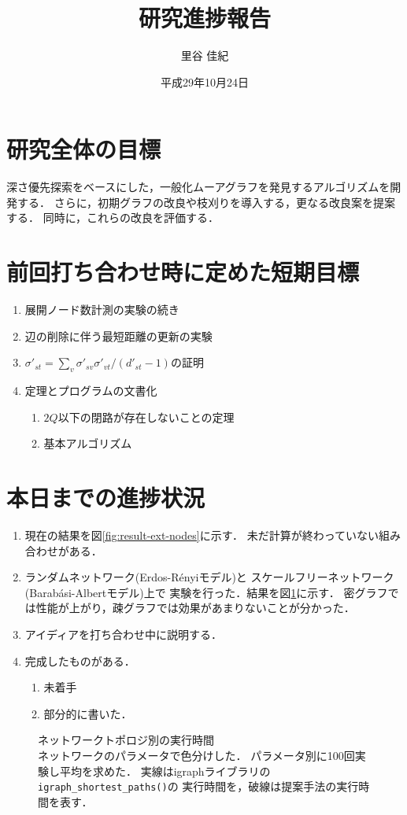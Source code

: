 \documentclass[11pt]{jarticle}
\title{研究進捗報告}
\author{里谷 佳紀}
\date{平成29年10月24日}
\begin{document}
%
\maketitle
\thispagestyle{empty}
%
\section{研究全体の目標}
深さ優先探索をベースにした，一般化ムーアグラフを発見するアルゴリズムを開発する．
さらに，初期グラフの改良や枝刈りを導入する，更なる改良案を提案する．
同時に，これらの改良を評価する．
\section{前回打ち合わせ時に定めた短期目標}
\begin{enumerate}
\item 展開ノード数計測の実験の続き
\item 辺の削除に伴う最短距離の更新の実験
\item $\sigma'_{st}=\sum_v\sigma'_{sv}\sigma'_{vt}/(d'_{st}-1)$の証明
\item 定理とプログラムの文書化
  \begin{enumerate}
  \item $2Q$以下の閉路が存在しないことの定理
  \item 基本アルゴリズム
  \end{enumerate}
\end{enumerate}
\section{本日までの進捗状況}
\begin{enumerate}
\item 現在の結果を図\ref{fig:result-ext-nodes}に示す．
  未だ計算が終わっていない組み合わせがある．
\item ランダムネットワーク(Erdos-R{\'e}nyiモデル)と
  スケールフリーネットワーク(Barab{\'a}si-Albertモデル)上で
  実験を行った．結果を図\ref{fig:result}に示す．
  密グラフでは性能が上がり，疎グラフでは効果があまりないことが分かった．
\item アイディアを打ち合わせ中に説明する．
\item 完成したものがある．
  \begin{enumerate}
  \item 未着手
  \item 部分的に書いた．
  \end{enumerate}
\end{enumerate}

\begin{figure}[H]
  \centering
  \hfill
  \caption{ネットワークトポロジ別の実行時間 \\
    ネットワークのパラメータで色分けした．
    パラメータ別に100回実験し平均を求めた．
    実線はigraphライブラリの\texttt{igraph\_shortest\_paths()}の
    実行時間を，破線は提案手法の実行時間を表す．
  }
  \label{fig:result}
\end{figure}
\end{document}
